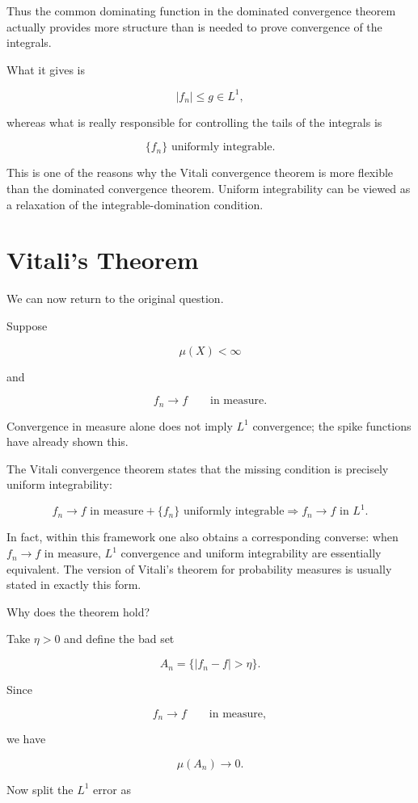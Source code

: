 \documentclass[11pt]{article}
\begin{document}
Thus the common dominating function in the dominated convergence theorem actually provides more structure than is needed to prove convergence of the integrals.

What it gives is

\[
|f_n|\leq g\in L^1,
\]

whereas what is really responsible for controlling the tails of the integrals is

\[
\{f_n\}\text{ uniformly integrable}.
\]

This is one of the reasons why the Vitali convergence theorem is more flexible than the dominated convergence theorem. Uniform integrability can be viewed as a relaxation of the integrable-domination condition.


\section{Vitali's Theorem}


We can now return to the original question.

Suppose

\[
\mu(X)<\infty
\]

and

\[
f_n\to f
\qquad\text{in measure}.
\]

Convergence in measure alone does not imply $L^1$ convergence; the spike functions have already shown this.

The Vitali convergence theorem states that the missing condition is precisely uniform integrability:

\[
\boxed{
f_n\to f\text{ in measure}
+
\{f_n\}\text{ uniformly integrable}
\Longrightarrow
f_n\to f\text{ in }L^1.
}
\]

In fact, within this framework one also obtains a corresponding converse: when $f_n\to f$ in measure, $L^1$ convergence and uniform integrability are essentially equivalent. The version of Vitali's theorem for probability measures is usually stated in exactly this form.

Why does the theorem hold?

Take $\eta>0$ and define the bad set

\[
A_n
=
\{|f_n-f|>\eta\}.
\]

Since

\[
f_n\to f
\qquad\text{in measure},
\]

we have

\[
\mu(A_n)\to0.
\]

Now split the $L^1$ error as
\end{document}
